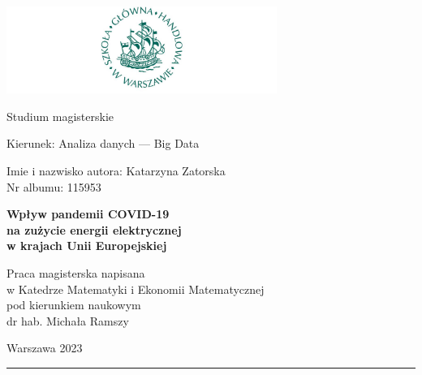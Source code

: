 \documentclass[polish, twoside, 12pt, a4paper]{article}
\theoremstyle{definition}
\theoremstyle{plain}
\theoremstyle{remark}
\begin{document}
\begin{titlepage}
\centering

\includegraphics[width=0.66\textwidth]{logo.JPG}

\vspace*{0.5cm}
Studium magisterskie\\
\begin{flushleft}
Kierunek: Analiza danych --- Big Data\\
\end{flushleft}

\vspace*{.5cm}
\rule{0cm}{1cm}\hfill
\begin{minipage}{9cm}
Imie i nazwisko autora: Katarzyna Zatorska\\
Nr albumu: 115953
\end{minipage}

\vspace*{1cm}
\begin{minipage}{12cm}
\centering
\Large
\textbf{Wpływ pandemii COVID-19\\na zużycie energii elektrycznej\\w krajach Unii Europejskiej}
\end{minipage}

\vspace*{2cm}
\rule{0cm}{1cm}\hfill
\begin{minipage}{9cm}
Praca magisterska napisana\\
w Katedrze Matematyki i Ekonomii Matematycznej\\
pod kierunkiem naukowym\\
dr hab. Michała Ramszy
\end{minipage}

\vfill
Warszawa 2023
\end{titlepage}

\rule{1ex}{0ex}\clearpage


\cleardoublepage
\tableofcontents


\clearpage
\end{document}
